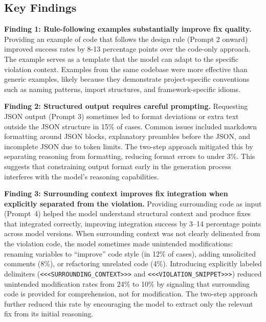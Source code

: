 \documentclass[conference]{IEEEtran}
\begin{document}
\subsection{Key Findings}

\textbf{Finding 1: Rule-following examples substantially improve fix quality.} Providing an example of code that  follows the design rule (Prompt 2 onward) improved success rates by 8-13 percentage points over the code-only approach. The example serves as a template that the model can adapt to the specific violation context. Examples from the same codebase were more effective than generic examples, likely because they demonstrate project-specific conventions such as naming patterns, import structures, and framework-specific idioms. %

\textbf{Finding 2: Structured output requires careful prompting.} Requesting JSON output (Prompt 3) sometimes led to format deviations or extra text outside the JSON structure in 15\% of cases. Common issues included markdown formatting around JSON blocks, explanatory preambles before the JSON, and incomplete JSON due to token limits. The two-step approach mitigated this by separating reasoning from formatting, reducing format errors to under 3\%. This suggests that constraining output format early in the generation process interferes with the model's reasoning capabilities.

\textbf{Finding 3: Surrounding context improves fix integration when 
explicitly separated from the violation.} Providing surrounding code 
as input (Prompt~4) helped the model understand structural context and 
produce fixes that integrated correctly, improving integration success 
by 3--14 percentage points across model versions. When 
surrounding context was not clearly delineated from the violation 
code, the model sometimes made unintended modifications: renaming 
variables to ``improve'' code style (in 12\% of cases), adding 
unsolicited comments (8\%), or refactoring unrelated code (4\%). 
Introducing explicitly labeled delimiters 
(\texttt{<<<SURROUNDING\_CONTEXT>>>} and 
\texttt{<<<VIOLATION\_SNIPPET>>>}) reduced unintended modification 
rates from 24\% to 10\% by signaling that surrounding code is 
provided for comprehension, not for modification. The two-step 
approach further reduced this rate by encouraging the model to 
extract only the relevant fix from its initial reasoning.
\end{document}
